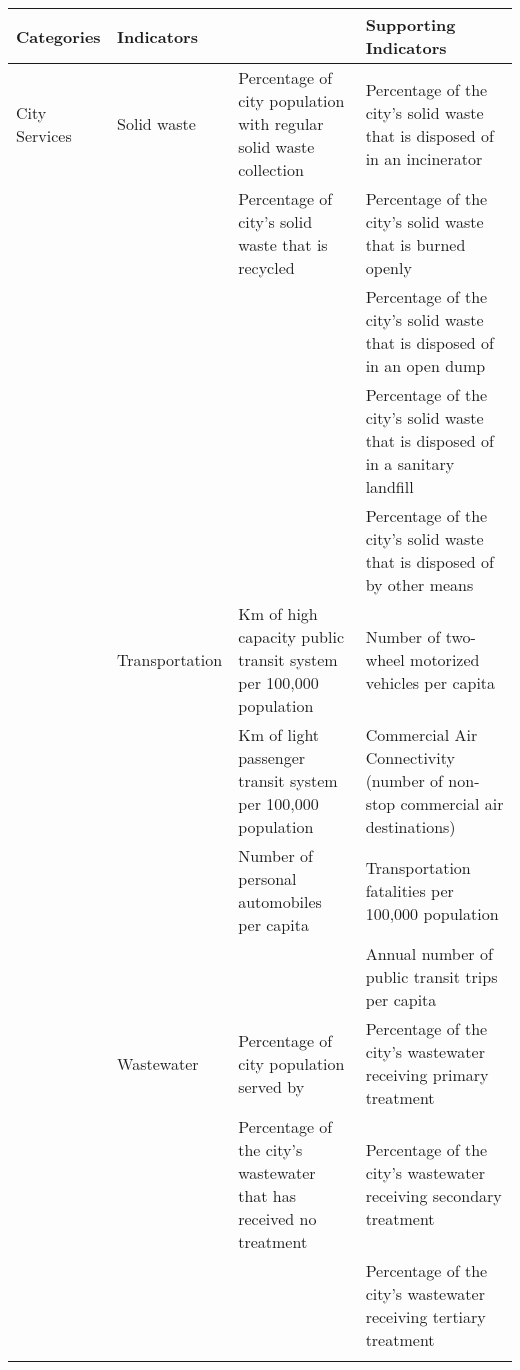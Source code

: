 \begin{landscape}
\begin{table}[th]
\begin{center}
\begin{tabular}{ >{\raggedright\arraybackslash}p{} >{\raggedright\arraybackslash}p{} >{\raggedright\arraybackslash}p{} >{\raggedright\arraybackslash}p{} } 
\hline
Categories & Indicators &  & Supporting Indicators \\
\hline
City Services & Solid waste & Percentage of city population with regular solid waste collection & Percentage of the city’s solid waste that is disposed of in an incinerator \\
  &  & Percentage of city’s solid waste that is recycled & Percentage of the city’s solid waste that is burned openly \\
  &  &  & Percentage of the city’s solid waste that is disposed of in an open dump \\
  &  &  & Percentage of the city’s solid waste that is disposed of in a sanitary landfill \\
  &  &  & Percentage of the city’s solid waste that is disposed of by other means \\
  & Transportation & Km of high capacity public transit system per 100,000 population & Number of two-wheel motorized vehicles per capita \\
  &  & Km of light passenger transit system per 100,000 population & Commercial Air Connectivity (number of non- stop commercial air destinations) \\
  &  & Number of personal automobiles per capita & Transportation fatalities per 100,000 population \\
  &  &  & Annual number of public transit trips per capita \linebreak \\
  & Wastewater & Percentage of city population served by & Percentage of the city’s wastewater receiving primary treatment \\
  &  & Percentage of the city’s wastewater that has received no treatment & Percentage of the city’s wastewater receiving secondary treatment \\
  &  &  & Percentage of the city’s wastewater receiving tertiary treatment \\
\hline
\label{tbl:globalCityIndicatorsFacility2}
\end{tabular}
\end{center}
\end{table}


\end{landscape}
